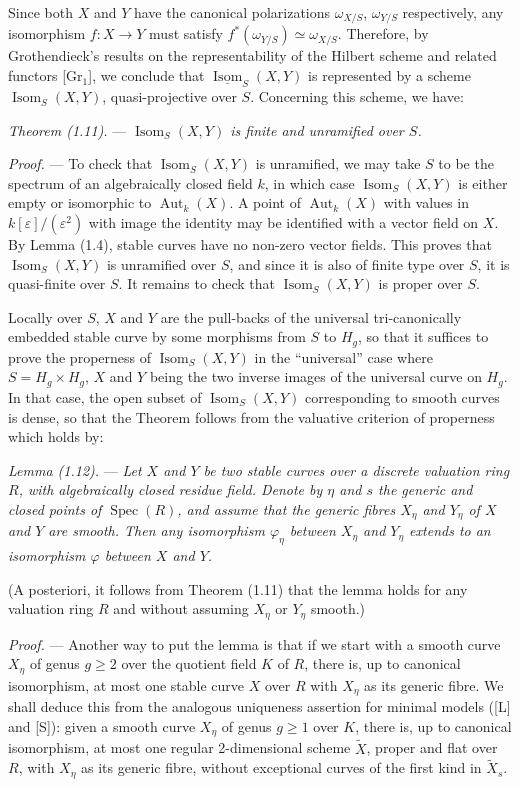 \documentclass[10pt]{article}
\newcommand{\Spec}{\operatorname{Spec}}
\newcommand{\Aut}{\operatorname{Aut}}
\newcommand{\Isom}{\operatorname{Isom}}
\newcommand{\eps}{\varepsilon}
\begin{document}
Since both $X$ and $Y$ have the canonical polarizations $\omega_{X/S}$, $\omega_{Y/S}$ respectively, any isomorphism $f:X\to Y$ must satisfy $f^*(\omega_{Y/S})\simeq\omega_{X/S}$. Therefore, by Grothendieck's results on the representability of the Hilbert scheme and related functors [Gr$_1$], we conclude that $\underline{\Isom}_S(X,Y)$ is represented by a scheme $\Isom_S(X,Y)$, quasi-projective over $S$. Concerning this scheme, we have:

\medskip
\noindent\emph{Theorem (1.11).} --- \emph{$\Isom_S(X,Y)$ is finite and unramified over $S$.}

\noindent\emph{Proof.} --- To check that $\Isom_S(X,Y)$ is unramified, we may take $S$ to be the spectrum of an algebraically closed field $k$, in which case $\Isom_S(X,Y)$ is either empty or isomorphic to $\Aut_k(X)$. A point of $\Aut_k(X)$ with values in $k[\eps]/(\eps^2)$ with image the identity may be identified with a vector field on $X$. By Lemma (1.4), stable curves have no non-zero vector fields. This proves that $\Isom_S(X,Y)$ is unramified over $S$, and since it is also of finite type over $S$, it is quasi-finite over $S$. It remains to check that $\Isom_S(X,Y)$ is proper over $S$.

Locally over $S$, $X$ and $Y$ are the pull-backs of the universal tri-canonically embedded stable curve by some morphisms from $S$ to $H_g$, so that it suffices to prove the properness of $\Isom_S(X,Y)$ in the ``universal'' case where $S=H_g\times H_g$, $X$ and $Y$ being the two inverse images of the universal curve on $H_g$. In that case, the open subset of $\Isom_S(X,Y)$ corresponding to smooth curves is dense, so that the Theorem follows from the valuative criterion of properness which holds by:

\medskip
\noindent\emph{Lemma (1.12).} --- \emph{Let $X$ and $Y$ be two stable curves over a discrete valuation ring $R$, with algebraically closed residue field. Denote by $\eta$ and $s$ the generic and closed points of $\Spec(R)$, and assume that the generic fibres $X_\eta$ and $Y_\eta$ of $X$ and $Y$ are smooth. Then any isomorphism $\varphi_\eta$ between $X_\eta$ and $Y_\eta$ extends to an isomorphism $\varphi$ between $X$ and $Y$.}

(A posteriori, it follows from Theorem (1.11) that the lemma holds for any valuation ring $R$ and without assuming $X_\eta$ or $Y_\eta$ smooth.)

\noindent\emph{Proof.} --- Another way to put the lemma is that if we start with a smooth curve $X_\eta$ of genus $g\geq2$ over the quotient field $K$ of $R$, there is, up to canonical isomorphism, at most one stable curve $X$ over $R$ with $X_\eta$ as its generic fibre. We shall deduce this from the analogous uniqueness assertion for minimal models ([L] and [S]): given a smooth curve $X_\eta$ of genus $g\geq1$ over $K$, there is, up to canonical isomorphism, at most one regular 2-dimensional scheme $\widetilde X$, proper and flat over $R$, with $X_\eta$ as its generic fibre, without exceptional curves of the first kind in $\widetilde X_s$.
\end{document}
